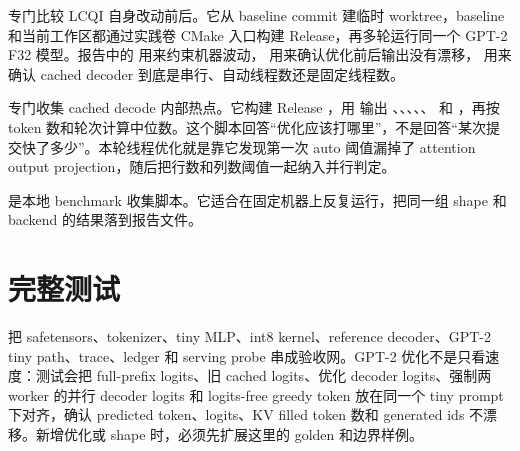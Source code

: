 

 专门比较 LCQI 自身改动前后。它从 baseline commit 建临时 worktree，baseline 和当前工作区都通过实践卷 CMake 入口构建 Release，再多轮运行同一个 GPT-2 F32 模型。报告中的  用来约束机器波动， 用来确认优化前后输出没有漂移， 用来确认 cached decoder 到底是串行、自动线程数还是固定线程数。



 专门收集 cached decode 内部热点。它构建 Release ，用  输出 、、、、、 和 ，再按 token 数和轮次计算中位数。这个脚本回答“优化应该打哪里”，不是回答“某次提交快了多少”。本轮线程优化就是靠它发现第一次 auto 阈值漏掉了 attention output projection，随后把行数和列数阈值一起纳入并行判定。



 是本地 benchmark 收集脚本。它适合在固定机器上反复运行，把同一组 shape 和 backend 的结果落到报告文件。



\section{完整测试}

 把 safetensors、tokenizer、tiny MLP、int8 kernel、reference decoder、GPT-2 tiny path、trace、ledger 和 serving probe 串成验收网。GPT-2 优化不是只看速度：测试会把 full-prefix logits、旧 cached logits、优化 decoder logits、强制两 worker 的并行 decoder logits 和 logits-free greedy token 放在同一个 tiny prompt 下对齐，确认 predicted token、logits、KV filled token 数和 generated ids 不漂移。新增优化或 shape 时，必须先扩展这里的 golden 和边界样例。


